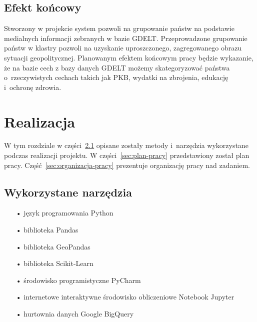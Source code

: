 \documentclass[11pt]{report}
\begin{document}
    \section{Efekt końcowy}\label{sec:efekt-końcowy}
    Stworzony w projekcie system pozwoli na grupowanie państw na podstawie medialnych informacji zebranych w bazie GDELT.
    Przeprowadzone grupowanie państw w klastry pozwoli na uzyskanie uproszczonego, zagregowanego obrazu sytuacji geopolitycznej.
    Planowanym efektem końcowym pracy będzie wykazanie, że na bazie cech z bazy danych GDELT możemy skategoryzować państwa o~rzeczywistych cechach takich jak PKB, wydatki na zbrojenia, edukację i~ochronę zdrowia.


    \chapter{Realizacja}\label{ch:realizacja}

    W tym rozdziale w części~\ref{sec:wykorzystane-narzędzia} opisane zostały metody i~narzędzia wykorzystane podczas realizacji projektu.
    W części~\ref{sec:plan-pracy} przedstawiony został plan pracy.
    Część~\ref{sec:organizacja-pracy} prezentuje organizację pracy nad zadaniem.


    \section{Wykorzystane narzędzia}\label{sec:wykorzystane-narzędzia}

    \begin{enumerate}
        \item[•] język programowania Python~\cite{python}
        \item[•] biblioteka Pandas~\cite{pandas}
        \item[•] biblioteka GeoPandas~\cite{geopandas}
        \item[•] biblioteka Scikit-Learn~\cite{scikit}
        \item[•] środowisko programistyczne PyCharm~\cite{pycharm}
        \item[•] internetowe interaktywne środowisko obliczeniowe Notebook Jupyter~\cite{jupyter}
        \item[•] hurtownia danych Google BigQuery~\cite{bigquery}
    \end{enumerate}
\end{document}
